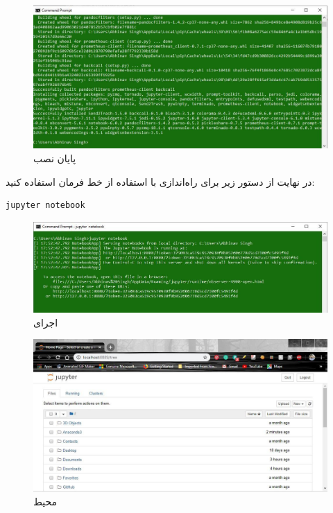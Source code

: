 \documentclass{article}
\begin{document}
\begin{figure}[H]
    \centering
    \includegraphics[width=1.0\textwidth]{figures/11.jpg}
    \caption
	{پایان نصب}
    \label{fig:fig1}
\end{figure}

در نهایت از دستور زیر برای راه‌اندازی  با استفاده از خط فرمان استفاده کنید:
\begin{latin}
\begin{lstlisting}[language=Python]
jupyter notebook
\end{lstlisting}
\end{latin}

\begin{figure}[H]
    \centering
    \includegraphics[width=1.0\textwidth]{figures/12.jpg}
    \caption
	{اجرای }
    \label{fig:fig1}
\end{figure}
\begin{figure}[H]
    \centering
    \includegraphics[width=1.0\textwidth]{figures/13.jpg}
    \caption
	{محیط }
    \label{fig:fig1}
\end{figure}
\end{document}
